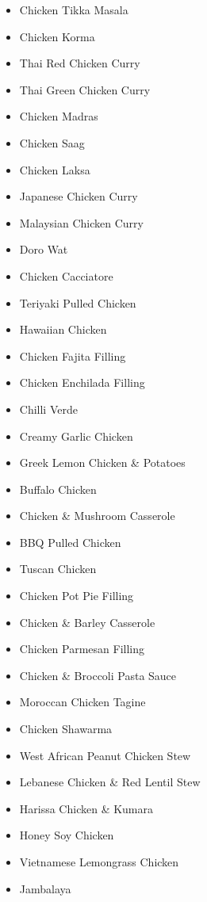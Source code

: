 \begin{itemize}
  \item \todo Chicken Tikka Masala
  \item \todo Chicken Korma
  \item \todo Thai Red Chicken Curry
  \item \todo Thai Green Chicken Curry
  \item \todo Chicken Madras
  \item \todo Chicken Saag 
  \item \todo Chicken Laksa 
  \item \todo Japanese Chicken Curry 
  \item \todo Malaysian Chicken Curry
  \item \todo Doro Wat 
\end{itemize}

\begin{itemize}
  \item \todo Chicken Cacciatore
  \item \todo Teriyaki Pulled Chicken
  \item \todo Hawaiian Chicken
  \item \todo Chicken Fajita Filling
  \item \todo Chicken Enchilada Filling 
  \item \todo Chilli Verde 
  \item \todo Creamy Garlic Chicken 
  \item \todo Greek Lemon Chicken \& Potatoes
  \item \todo Buffalo Chicken
  \item \todo Chicken \& Mushroom Casserole
  \item \todo BBQ Pulled Chicken
  \item \todo Tuscan Chicken 
  \item \todo Chicken Pot Pie Filling
  \item \todo Chicken \& Barley Casserole
  \item \todo Chicken Parmesan Filling
  \item \todo Chicken \& Broccoli Pasta Sauce
  \item \todo Moroccan Chicken Tagine
  \item \todo Chicken Shawarma 
  \item \todo West African Peanut Chicken Stew 
  \item \todo Lebanese Chicken \& Red Lentil Stew
  \item \todo Harissa Chicken \& Kumara
  \item \todo Honey Soy Chicken
  \item \todo Vietnamese Lemongrass Chicken
  \item \todo Jambalaya
\end{itemize}

